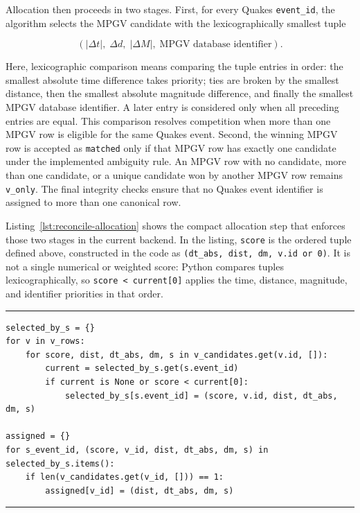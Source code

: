 \documentclass[12pt]{article}
\begin{document}
Allocation then proceeds in two stages. First, for every Quakes \texttt{event\_id}, the algorithm selects the MPGV candidate with the lexicographically smallest tuple

\[
(|\Delta t|,\; \Delta d,\; |\Delta M|,\; \text{MPGV database identifier}).
\]

Here, lexicographic comparison means comparing the tuple entries in order: the smallest absolute time difference takes priority; ties are broken by the smallest distance, then the smallest absolute magnitude difference, and finally the smallest MPGV database identifier. A later entry is considered only when all preceding entries are equal. This comparison resolves competition when more than one MPGV row is eligible for the same Quakes event. Second, the winning MPGV row is accepted as \texttt{matched} only if that MPGV row has exactly one candidate under the implemented ambiguity rule. An MPGV row with no candidate, more than one candidate, or a unique candidate won by another MPGV row remains \texttt{v\_only}. The final integrity checks ensure that no Quakes event identifier is assigned to more than one canonical row.

Listing~\ref{lst:reconcile-allocation} shows the compact allocation step that enforces those two stages in the current backend. In the listing, \texttt{score} is the ordered tuple defined above, constructed in the code as \texttt{(dt\_abs, dist, dm, v.id or 0)}. It is not a single numerical or weighted score: Python compares tuples lexicographically, so \texttt{score < current[0]} applies the time, distance, magnitude, and identifier priorities in that order.

\begin{codelisting}[H]
\centering
\begin{minipage}{0.96\linewidth}
\hrule
\small
\begin{verbatim}
selected_by_s = {}
for v in v_rows:
    for score, dist, dt_abs, dm, s in v_candidates.get(v.id, []):
        current = selected_by_s.get(s.event_id)
        if current is None or score < current[0]:
            selected_by_s[s.event_id] = (score, v.id, dist, dt_abs, dm, s)

assigned = {}
for s_event_id, (score, v_id, dist, dt_abs, dm, s) in selected_by_s.items():
    if len(v_candidates.get(v_id, [])) == 1:
        assigned[v_id] = (dist, dt_abs, dm, s)
\end{verbatim}
\hrule
\end{minipage}
\caption{One-to-one Quakes candidate allocation in \texttt{reconcile.py}.}
\label{lst:reconcile-allocation}
\end{codelisting}
\end{document}
